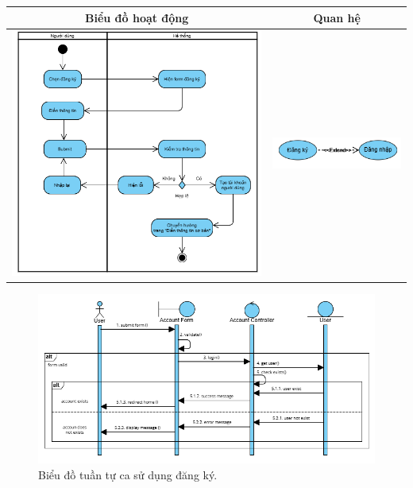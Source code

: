 \noindent 
\begin{tabular}{| c | c |}
    \hline
    \textbf{Biểu đồ hoạt động} & \textbf{Quan hệ} \\ 
    \hline
    \includegraphics[width=0.6\linewidth]{figures/c3/3-3-2-activity-diagram.png} 
    & 
    \includegraphics[width=0.35\linewidth]{figures/c3/3-3-2-relationship.png} \\ 
    \hline
\end{tabular}

\begin{figure}[H]
    \centering  
    \includegraphics[width=1.1\textwidth]{figures/c3/3-3-1-sequence-diagram.png}
    \caption{Biểu đồ tuần tự ca sử dụng đăng ký.}
    \label{fig:3-3-2-sequence-diagram}
\end{figure}
